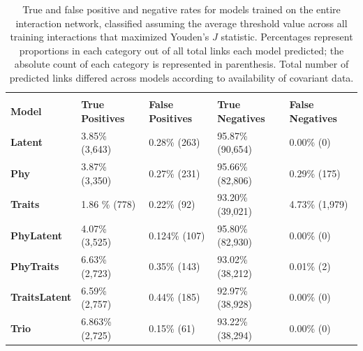 \documentclass[num-refs]{article}%
\providecommand{\DIFaddbeginFL}{} %
\providecommand{\DIFaddendFL}{} %
\newcommand{\DIFaddincludegraphics}[2][]{{\color{blue}\fbox{\DIFOincludegraphics[#1]{#2}}}} %
\DeclareRobustCommand{\DIFaddbeginFL}{\DIFOaddbeginFL \let\includegraphics\DIFaddincludegraphics} %
\DeclareRobustCommand{\DIFaddendFL}{\DIFOaddendFL \let\includegraphics\DIFOincludegraphics} %
\begin{document}
\begin{table}[]
\caption{True and false positive and negative rates for models trained on the entire interaction network, classified assuming the average threshold value across all training interactions that maximized Youden's $J$ statistic. Percentages represent proportions in each category out of all total links each model predicted; the absolute count of each category is represented in parenthesis. Total number of predicted links differed across models according to availability of covariant data.}
\label{tab:confusion}
\DIFaddbeginFL \vspace{20pt}
\DIFaddendFL \begin{tabular}{@{}lllll@{}}
\toprule
{\ul } & {\ul } & {\ul } & {\ul } & {\ul } \\ 
   \textbf{Model}    &  \textbf{True Positives}      &    \textbf{False Positives}    &    \textbf{True Negatives}    &    \textbf{False Negatives}    \\
\midrule
\textbf{Latent}   &  3.85\% (3,643)      &    0.28\% (263)&    95.87\% (90,654)&    0.00\% (0)    \\
\textbf{Phy}       &   3.87\% (3,350)&  0.27\% (231)&   95.66\% (82,806)&     0.29\% (175)\\
\textbf{Traits}       &   1.86 \% (778)&  0.22\% (92)&  93.20\% (39,021)&       4.73\% (1,979)\\ 
\textbf{PhyLatent}       &    4.07\% (3,525)&     0.124\% (107)&    95.80\% (82,930)&    0.00\% (0)     \\ 
\textbf{PhyTraits}      &   6.63\% (2,723)&  0.35\% (143)&    93.02\% (38,212)&   0.01\% (2)\\ 
\textbf{TraitsLatent}       &   6.59\% (2,757)     & 0.44\% (185)& 92.97\% (38,928)&   0.00\% (0)     \\ 
\textbf{Trio}       &   6.863\% (2,725)&  0.15\% (61)&  93.22\% (38,294)&     0.00\% (0)    \\ 
\bottomrule
\end{tabular}
\end{table}


\clearpage 



\end{document}
